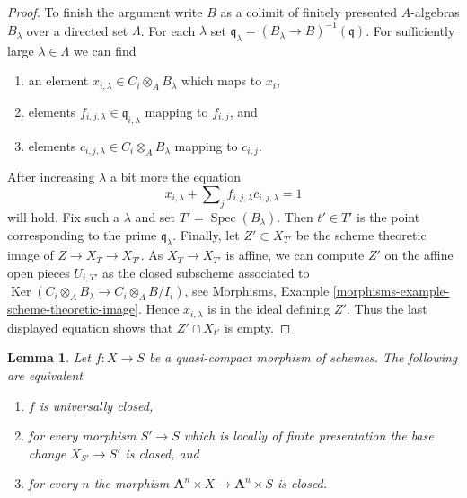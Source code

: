 \documentclass{stacks-project}
\theoremstyle{plain}
\newtheorem{lemma}[subsection]{Lemma}
\theoremstyle{definition}
\theoremstyle{remark}
\numberwithin{equation}{subsection}
\def\Spec{\mathop{\mathrm{Spec}}}
\def\Ker{\mathop{\mathrm{Ker}}}
\begin{document}
\begin{proof}
\medskip\noindent
To finish the argument write $B$ as a colimit of finitely presented
$A$-algebras $B_\lambda$ over a directed set $\Lambda$.
For each $\lambda$ set
$\mathfrak q_\lambda = (B_\lambda \to B)^{-1}(\mathfrak q)$.
For sufficiently large $\lambda \in \Lambda$ we can find
\begin{enumerate}
\item an element
$x_{i, \lambda} \in C_i \otimes_A B_\lambda$ which maps to $x_i$,
\item elements $f_{i, j, \lambda} \in \mathfrak q_{i, \lambda}$
mapping to $f_{i, j}$, and
\item elements $c_{i, j, \lambda} \in C_i \otimes_A B_\lambda$
mapping to $c_{i, j}$.
\end{enumerate}
After increasing $\lambda$ a bit more the equation
$$
x_{i, \lambda} + \sum\nolimits_j f_{i, j, \lambda}c_{i, j, \lambda} = 1
$$
will hold. Fix such a $\lambda$ and set $T' = \Spec(B_\lambda)$.
Then $t' \in T'$ is the point corresponding to the prime $\mathfrak q_\lambda$.
Finally, let $Z' \subset X_{T'}$ be the scheme theoretic image of
$Z \to X_T \to X_{T'}$. As $X_T \to X_{T'}$ is affine, we can compute $Z'$
on the affine open pieces $U_{i, T'}$ as the closed subscheme associated
to $\Ker(C_i \otimes_A B_\lambda \to C_i \otimes_A B/I_i)$, see
Morphisms, Example \ref{morphisms-example-scheme-theoretic-image}.
Hence $x_{i, \lambda}$ is in the ideal defining $Z'$. Thus the last
displayed equation shows that $Z' \cap X_{t'}$ is empty.
\end{proof}

\begin{lemma}
\label{lemma-test-universally-closed}
Let $f : X \to S$ be a quasi-compact morphism of schemes.
The following are equivalent
\begin{enumerate}
\item $f$ is universally closed,
\item for every morphism $S' \to S$ which is locally of finite presentation
the base change $X_{S'} \to S'$ is closed, and
\item for every $n$ the morphism
$\mathbf{A}^n \times X \to \mathbf{A}^n \times S$
is closed.
\end{enumerate}
\end{lemma}
\end{document}
